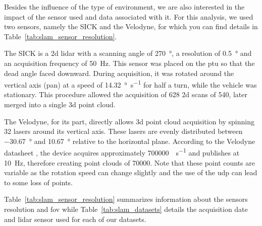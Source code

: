 Besides the influence of the type of environment, we are also interested in the impact of the sensor used and data associated with it. For this analysis, we used two sensors, namely the SICK and the Velodyne, for which you can find details in Table~\ref{tab:slam_sensor_resolution}.

The SICK is a \gls*{2d} \gls*{lidar} with a scanning angle of \SI{270}{\degree}, a resolution of \SI{0.5}{\degree} and an acquisition frequency of \SI{50}{\hertz}. This sensor was placed on the \gls*{ptu} so that the dead angle faced downward. During acquisition, it was rotated around the vertical axis (pan) at a speed of \SI{14.32}{\degree\per\second} for half a turn, while the vehicle was stationary. This procedure allowed the acquisition of 628 \gls*{2d} scans of \SI{540}{\points}, later merged into a single \gls*{3d} point cloud.

The Velodyne, for its part, directly allows \gls*{3d} point cloud acquisition by spinning 32 lasers around its vertical axis. These lasers are evenly distributed between \SI{-30.67}{\degree} and \SI{10.67}{\degree} relative to the horizontal plane. According to the Velodyne datasheet \citep{VelodyneDatasheet}, the device acquires approximately \SI{700000}{\points\per\second} and publishes at \SI{10}{\hertz}, therefore creating point clouds of \SI{70000}{\points}. Note that these point counts are variable as the rotation speed can change slightly and the use of the \gls*{udp} can lead to some loss of points.

Table~\ref{tab:slam_sensor_resolution} summarizes information about the sensors resolution and \gls*{fov} while Table~\ref{tab:slam_datasets} details the acquisition date and \gls*{lidar} sensor used for each of our datasets.

